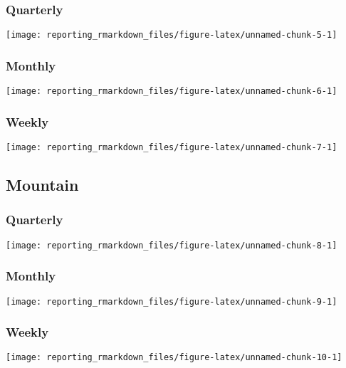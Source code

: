 \documentclass[
]{article}
\begin{document}
\hypertarget{quarterly}{%
\subsubsection{Quarterly}\label{quarterly}}

\begin{center}\texttt{[image: reporting\_rmarkdown\_files/figure-latex/unnamed-chunk-5-1]} \end{center}

\hypertarget{monthly}{%
\subsubsection{Monthly}\label{monthly}}

\begin{center}\texttt{[image: reporting\_rmarkdown\_files/figure-latex/unnamed-chunk-6-1]} \end{center}

\hypertarget{weekly}{%
\subsubsection{Weekly}\label{weekly}}

\begin{center}\texttt{[image: reporting\_rmarkdown\_files/figure-latex/unnamed-chunk-7-1]} \end{center}

\hypertarget{mountain}{%
\subsection{Mountain}\label{mountain}}

\hypertarget{quarterly-1}{%
\subsubsection{Quarterly}\label{quarterly-1}}

\begin{center}\texttt{[image: reporting\_rmarkdown\_files/figure-latex/unnamed-chunk-8-1]} \end{center}

\hypertarget{monthly-1}{%
\subsubsection{Monthly}\label{monthly-1}}

\begin{center}\texttt{[image: reporting\_rmarkdown\_files/figure-latex/unnamed-chunk-9-1]} \end{center}

\hypertarget{weekly-1}{%
\subsubsection{Weekly}\label{weekly-1}}

\begin{center}\texttt{[image: reporting\_rmarkdown\_files/figure-latex/unnamed-chunk-10-1]} \end{center}
\end{document}
